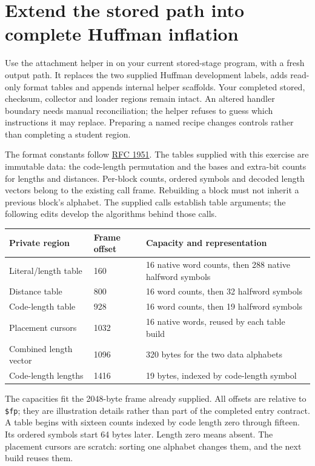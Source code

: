 \section{Extend the stored path into complete Huffman inflation}
Use the attachment helper in  on your
current stored-stage program, with a fresh output path. It replaces the two supplied
Huffman development labels, adds read-only format tables and appends internal helper
scaffolds. Your completed stored, checksum, collector and loader regions remain intact.
An altered handler boundary needs manual reconciliation; the helper refuses to guess
which instructions it may replace. Preparing a named recipe changes controls rather
than completing a student region.

The format constants follow \href{https://www.rfc-editor.org/rfc/rfc1951.html}{RFC 1951}.
The tables supplied with this exercise are immutable data: the code-length permutation
and the bases and extra-bit counts for lengths and distances. Per-block counts, ordered
symbols and decoded length vectors belong to the existing call frame. Rebuilding a
block must not inherit a previous block's alphabet. The supplied calls establish table
arguments; the following edits develop the algorithms behind those calls.

\begin{longtable}{p{40mm}p{23mm}p{85mm}}
  \toprule Private region & Frame offset & Capacity and representation                             \\\midrule
  Literal/length table    & 160          & 16 native word counts, then 288 native halfword symbols \\
  Distance table          & 800          & 16 word counts, then 32 halfword symbols                \\
  Code-length table       & 928          & 16 word counts, then 19 halfword symbols                \\
  Placement cursors       & 1032         & 16 native words, reused by each table build             \\
  Combined length vector  & 1096         & 320 bytes for the two data alphabets                    \\
  Code-length lengths     & 1416         & 19 bytes, indexed by code-length symbol                 \\\bottomrule
\end{longtable}
The capacities fit the 2048-byte frame already supplied. All offsets are relative to
\texttt{\$fp}; they are illustration details rather than part of the completed entry
contract. A table begins with sixteen counts indexed by code length zero through fifteen.
Its ordered symbols start 64 bytes later. Length zero means absent. The placement
cursors are scratch: sorting one alphabet changes them, and the next build reuses them.

